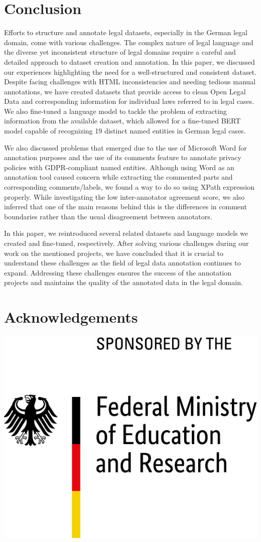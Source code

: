\documentclass{IOS-Book-Article}
\begin{document}
\section{Conclusion}

Efforts to structure and annotate legal datasets, especially in the German legal domain, come with various challenges. The complex nature of legal language and the diverse yet inconsistent structure of legal domains require a careful and detailed approach to dataset creation and annotation. In this paper, we discussed our experiences highlighting the need for a well-structured and consistent dataset. Despite facing challenges with HTML inconsistencies and needing tedious manual annotations, we have created datasets that provide access to clean Open Legal Data and corresponding information for individual laws referred to in legal cases. We also fine-tuned a language model to tackle the problem of extracting information from the available dataset, which allowed for a fine-tuned BERT model capable of recognizing 19 distinct named entities in German legal cases.

We also discussed problems that emerged due to the use of Microsoft Word for annotation purposes and the use of its comments feature to annotate privacy policies with GDPR-compliant named entities. Although using Word as an annotation tool caused concern while extracting the commented parts and corresponding comments/labels, we found a way to do so using XPath expression properly. While investigating the low inter-annotator agreement score, we also inferred that one of the main reasons behind this is the differences in comment boundaries rather than the usual disagreement between annotators.

In this paper, we reintroduced several related datasets and language models we created and fine-tuned, respectively. After solving various challenges during our work on the mentioned projects, we have concluded that it is crucial to understand these challenges as the field of legal data annotation continues to expand. Addressing these challenges ensures the success of the annotation projects and maintains the quality of the annotated data in the legal domain.

\section{Acknowledgements}

\begin{flushleft}
\includegraphics[width=0.25\linewidth]{BMBF.jpeg}
\end{flushleft} 
\end{document}
